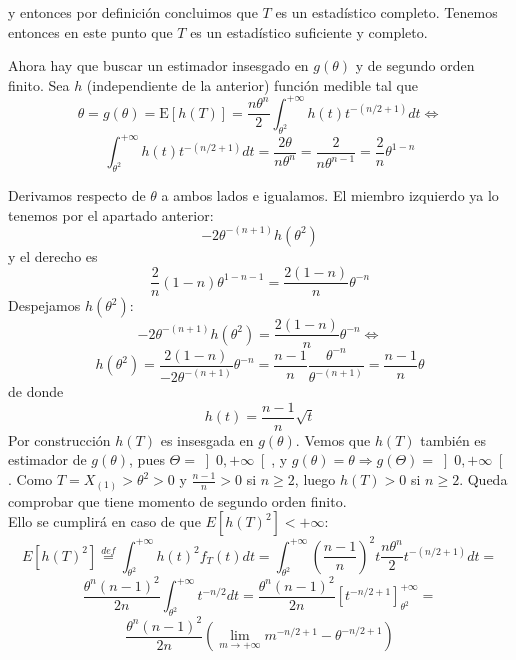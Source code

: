 \documentclass[12pt]{article}
\newcommand{\E}{\mathrm{E}}
\begin{document}
\begin{ejercicio}
\begin{enumerate}
            y entonces por definición concluimos que $T$ es un estadístico completo. Tenemos entonces en este punto
            que $T$ es un estadístico suficiente y completo. 

            \newpage

            Ahora hay que buscar un estimador insesgado en $g(\theta)$ y de segundo orden finito. 
            Sea $h$ (independiente de la anterior) función medible tal que
            $$\theta = g(\theta) = \E[h(T)] = \dfrac{n \theta^n}{2} \int_{\theta^2}^{+\infty} h(t) t^{-(n/2+1)} dt \iff$$
            $$\int_{\theta^2}^{+\infty} h(t) t^{-(n/2+1)} dt = \dfrac{2 \theta}{n \theta^n} = \dfrac{2}{n \theta^{n-1}} = 
            \dfrac{2}{n} \theta^{1-n} $$

            Derivamos respecto de $\theta$ a ambos lados e igualamos. El miembro izquierdo ya lo tenemos por el apartado anterior:
            $$-2\theta^{-(n+1)}h(\theta^2)$$
            y el derecho es 
            $$\dfrac{2}{n} (1-n) \theta^{1 - n - 1} = \dfrac{2(1-n)}{n} \theta^{-n}$$
            Despejamos $h(\theta^2)$:
            $$-2\theta^{-(n+1)}h(\theta^2) = \dfrac{2(1-n)}{n} \theta^{-n} \iff $$
            $$h(\theta^2) = \dfrac{2(1-n)}{-2\theta^{-(n+1)}} \theta^{-n} = \dfrac{n-1}{n} 
            \dfrac{\theta^{-n}}{\theta^{-(n+1)}} = \dfrac{n-1}{n} \theta$$
            de donde
            $$h(t) = \dfrac{n-1}{n} \sqrt{t}$$
            Por construcción $h(T)$ es insesgada en $g(\theta)$. Vemos que $h(T)$ también es estimador de $g(\theta)$, 
            pues $\Theta = \left] 0, +\infty \right[$, y $g(\theta) = \theta \Longrightarrow g(\Theta) = \left]0,+\infty \right[$. 
            Como $T = X_{(1)} > \theta^2 > 0$ y $\frac{n-1}{n} > 0$ si $n \geq 2$, luego $h(T) > 0$ si $n \geq 2$. Queda comprobar que tiene momento de segundo orden finito. \\

            Ello se cumplirá en caso de que $E[h(T)^2] < + \infty$:
            $$E[h(T)^2] \stackrel{def}{=} \int_{\theta^2}^{+\infty} h(t)^2 f_T(t) dt = \int_{\theta^2}^{+\infty} 
            \left( \dfrac{n-1}{n} \right)^2 t \dfrac{n \theta^n}{2} t^{-(n/2+1)} dt = $$
            $$\dfrac{\theta^n(n-1)^2}{2n} \int_{\theta^2}^{+\infty} t^{-n/2} dt = 
            \dfrac{\theta^n(n-1)^2}{2n} \left[t^{-n/2+1} \right]_{\theta^2}^{+\infty} = $$
            $$\dfrac{\theta^n(n-1)^2}{2n} \left( \lim\limits_{m \to +\infty} m^{-n/2+1} - \theta^{-n/2+1} \right)$$


\end{enumerate}
\end{ejercicio}
\end{document}
